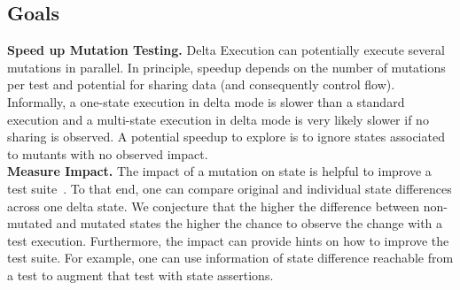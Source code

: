 \documentclass[10pt]{article}
\begin{document}
\subsection{Goals}

\noindent\textbf{Speed up Mutation Testing.}  
Delta Execution can potentially execute several mutations in parallel.
In principle, speedup depends on the number of mutations per test and
potential for sharing data (and consequently control flow).
Informally, a one-state execution in delta mode is slower than a
standard execution and a multi-state execution in delta mode is very
likely slower if no sharing is observed.  A potential speedup to
explore is to ignore states associated to mutants with no observed
impact.  \\

\noindent\textbf{Measure Impact.}
The impact of a mutation on state is helpful to improve a test
suite~\cite{schuler-issta-2009}. To that end, one can compare original and
individual state differences across one delta state.  We conjecture
that the higher the difference between non-mutated and mutated states
the higher the chance to observe the change with a test
execution. Furthermore, the impact can
provide hints on how to improve the test suite. For example, one can
use information of state difference reachable from a test to augment
that test with state assertions.  \\
\end{document}

